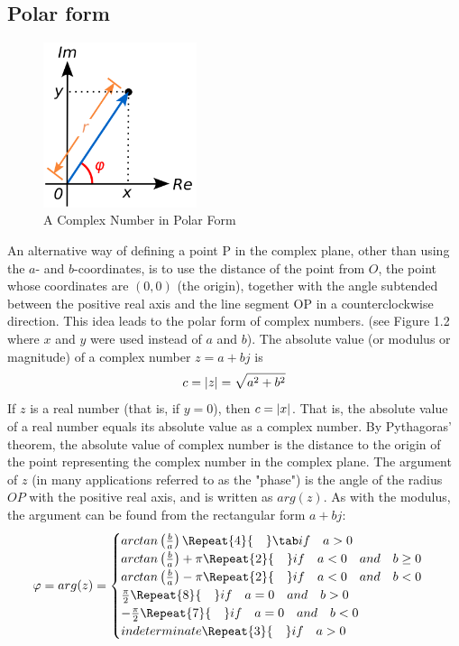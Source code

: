 \documentclass[12pt,oneside,openany]{memoir}
\numberwithin{equation}{subsection}
\DeclarePairedDelimiter{\abs}{\lvert}{\rvert}
\newcommand{\quads}[1]{\Repeat{#1}{\quad}}
\begin{document}
\subsection{Polar form}
\begin{figure}
\centering
\captionsetup{justification=centering}
\includegraphics[width=0.4\textwidth]{images/complex_number_polar_form.png}
\caption{A Complex Number in Polar Form}
\end{figure}
An alternative way of defining a point P in the complex plane, other than using the \(a\)- and \(b\)-coordinates, is to use the distance of the point from \(O\), the point whose coordinates are \((0, 0)\) (the origin), together with the angle subtended between the positive real axis and the line segment OP in a counterclockwise direction. This idea leads to the polar form of complex numbers. (see Figure 1.2 where \(x\) and \(y\) were used instead of \(a\) and \(b\)).
\bigbreak
The absolute value (or modulus or magnitude) of a complex number \(z = a + bj\) is
\[c = \abs{z} = \sqrt{a^2 + b^2}\]
If \(z\) is a real number (that is, if \(y = 0\)), then \(c = \abs{x}\). That is, the absolute value of a real number equals its absolute value as a complex number. By Pythagoras' theorem, the absolute value of complex number is the distance to the origin of the point representing the complex number in the complex plane. 
\bigbreak
The argument of \(z\) (in many applications referred to as the "phase") is the angle of the radius \(OP\) with the positive real axis, and is written as \(arg(z)\). As with the modulus, the argument can be found from the rectangular form \(a + bj\):
\[
	\varphi =
	arg(z) =	\begin{cases}
				arctan\left(\frac{b}{a}\right) \quads{4} \tab if \quad a > 0\\
				arctan\left(\frac{b}{a}\right) + \pi \quads{2} if \quad a < 0 \quad and \quad b \geq 0\\
				arctan\left(\frac{b}{a}\right) - \pi \quads{2} if \quad a < 0 \quad and \quad b < 0\\
				\frac{\pi}{2} \quads{8} if \quad a = 0 \quad and \quad b > 0\\
				-\frac{\pi}{2} \quads{7}  if \quad a = 0 \quad and \quad b < 0\\
				indeterminate \quads{3} if \quad a > 0
			\end{cases}
\]
\end{document}
